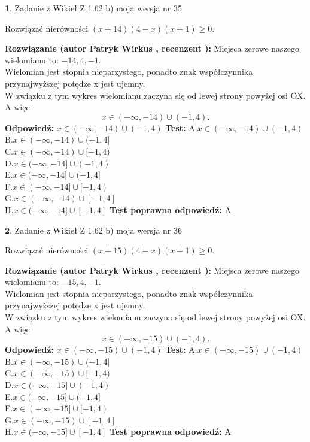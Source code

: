 \documentclass[12pt, a4paper]{article}
\theoremstyle{definition} %
\newtheorem{zad}{}
\newcommand{\zadStart}[1]{\begin{zad}#1\newline}
\newcommand{\zadStop}{\end{zad}}
\newcommand{\rozwStart}[2]{\noindent \textbf{Rozwiązanie (autor #1 , recenzent #2): }\newline}
\newcommand{\rozwStop}{\newline}
\newcommand{\odpStart}{\noindent \textbf{Odpowiedź:}\newline}
\newcommand{\odpStop}{\newline}
\newcommand{\testStart}{\noindent \textbf{Test:}\newline}
\newcommand{\testStop}{\newline}
\newcommand{\kluczStart}{\noindent \textbf{Test poprawna odpowiedź:}\newline}
\newcommand{\kluczStop}{\newline}
\begin{document}
\zadStart{Zadanie z Wikieł Z 1.62 b) moja wersja nr 35}

Rozwiązać nierówności $(x+14)(4-x)(x+1)\ge0$.
\zadStop
\rozwStart{Patryk Wirkus}{}
Miejsca zerowe naszego wielomianu to: $-14, 4, -1$.\\
Wielomian jest stopnia nieparzystego, ponadto znak współczynnika przy\linebreak najwyższej potędze x jest ujemny.\\ W związku z tym wykres wielomianu zaczyna się od lewej strony powyżej osi OX. A więc $$x \in (-\infty,-14) \cup (-1,4).$$
\rozwStop
\odpStart
$x \in (-\infty,-14) \cup (-1,4)$
\odpStop
\testStart
A.$x \in (-\infty,-14) \cup (-1,4)$\\
B.$x \in (-\infty,-14) \cup (-1,4]$\\
C.$x \in (-\infty,-14) \cup [-1,4)$\\
D.$x \in (-\infty,-14] \cup (-1,4)$\\
E.$x \in (-\infty,-14] \cup (-1,4]$\\
F.$x \in (-\infty,-14] \cup [-1,4)$\\
G.$x \in (-\infty,-14) \cup [-1,4]$\\
H.$x \in (-\infty,-14] \cup [-1,4]$
\testStop
\kluczStart
A
\kluczStop



\zadStart{Zadanie z Wikieł Z 1.62 b) moja wersja nr 36}

Rozwiązać nierówności $(x+15)(4-x)(x+1)\ge0$.
\zadStop
\rozwStart{Patryk Wirkus}{}
Miejsca zerowe naszego wielomianu to: $-15, 4, -1$.\\
Wielomian jest stopnia nieparzystego, ponadto znak współczynnika przy\linebreak najwyższej potędze x jest ujemny.\\ W związku z tym wykres wielomianu zaczyna się od lewej strony powyżej osi OX. A więc $$x \in (-\infty,-15) \cup (-1,4).$$
\rozwStop
\odpStart
$x \in (-\infty,-15) \cup (-1,4)$
\odpStop
\testStart
A.$x \in (-\infty,-15) \cup (-1,4)$\\
B.$x \in (-\infty,-15) \cup (-1,4]$\\
C.$x \in (-\infty,-15) \cup [-1,4)$\\
D.$x \in (-\infty,-15] \cup (-1,4)$\\
E.$x \in (-\infty,-15] \cup (-1,4]$\\
F.$x \in (-\infty,-15] \cup [-1,4)$\\
G.$x \in (-\infty,-15) \cup [-1,4]$\\
H.$x \in (-\infty,-15] \cup [-1,4]$
\testStop
\kluczStart
A
\kluczStop
\end{document}
